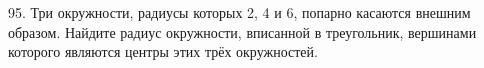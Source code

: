 95. Три окружности, радиусы которых 2, 4 и 6, попарно касаются внешним образом. Найдите радиус окружности, вписанной в треугольник, вершинами которого являются центры этих трёх окружностей.\\
